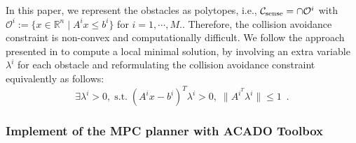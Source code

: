 %
In this paper, we represent the obstacles as polytopes, i.e., $\mathcal C_\text{sense} = \cap \mathcal{O}^{i}$ with $\mathcal{O}^{i}:= \{x\in\mathbb{R}^{n} \mid A^{i}x\leq b^{i}\}$ for $i = 1,\cdots ,M.$. Therefore, the collision avoidance constraint is non-convex and computationally difficult. We follow the approach presented in \cite{zhang_2017_MPC} to compute a local minimal solution, by involving an extra variable $\lambda^{i}$ for each obstacle and reformulating the collision avoidance constraint equivalently as follows: 
%
\begin{equation}
\exists \lambda^{i} >0, \; \mbox{s.t.} \; (A^{i}x- b^{i})^{T}\lambda^{i}  > 0, \; \|A^{i^{T}}\lambda^{i}\|\leq 1\enspace .
\end{equation}
%
\subsubsection{Implement of the MPC planner with ACADO Toolbox}
 

